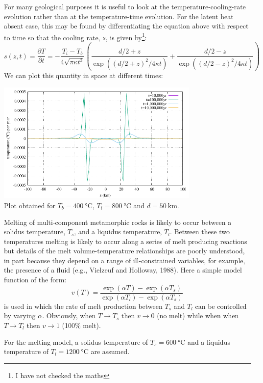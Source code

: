 For many geological purposes it is useful to look at the
temperature-cooling-rate evolution rather than at
the temperature-time evolution. For the latent
heat absent case, this may be found by differentiating the equation above 
with respect to time so that the cooling rate, $s$, is given by\footnote{I have not 
checked the maths}:
\[
s(z,t) = \frac{\partial T}{\partial t}
=-\frac{T_i-T_b}{4\sqrt{\pi \kappa t^3}}
\left(
\frac{d/2 +z}{\exp((d/2+z)^2/4\kappa t )}
+
\frac{d/2 -z}{\exp((d/2-z)^2/4\kappa t )}
\right)
\]
We can plot this quantity in space at different times:
\begin{center}
\includegraphics[width=10cm]{python_codes/fieldstone_169/images/solution_derv.pdf}\\
{\captionfont Plot obtained for $T_b=400~\si{\celsius}$, $T_i=800~\si{\celsius}$ and $d=50~\si{\km}$.}
\end{center}


Melting of multi-component metamorphic rocks is likely to occur between a solidus
temperature, $T_s$, and a liquidus temperature, $T_l$.
Between these two temperatures melting is likely
to occur along a series of melt producing reactions but details of the melt volume-temperature
relationships are poorly understood, in part because they depend on a range of ill-constrained
variables, for example, the presence of a fluid
(e.g., Vielzeuf and Holloway, 1988). Here a simple model function of the form:
\begin{equation}
v(T) 
= \frac{\exp(\alpha T)- \exp(\alpha T_s) }{\exp(\alpha T_l) - \exp(\alpha T_s) }
\label{eq:stuw95_eq3}
\end{equation}
is used in which the rate of melt production between $T_s$ and $T_l$ can be controlled by varying $\alpha$.
Obviously, when $T\rightarrow T_s$ then $v \rightarrow 0$ (no melt) while when
when $T\rightarrow T_l$ then $v \rightarrow 1$ (100\% melt).


For the melting model, a solidus temperature of $T_s=600~\si{\celsius}$ and a 
liquidus temperature of $T_l = 1200~\si{\celsius}$ are assumed.


